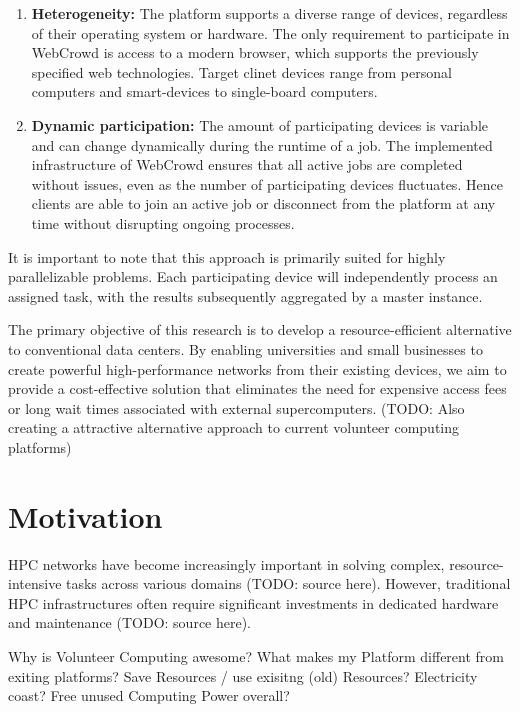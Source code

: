 \begin{enumerate}
    \item \textbf{Heterogeneity:} The platform supports a diverse range of devices, regardless of their operating system or hardware. The only requirement to participate in WebCrowd is access to a modern browser, which supports the previously specified web technologies. Target clinet devices range from personal computers and smart-devices to single-board computers.
    \item \textbf{Dynamic participation:} The amount of participating devices is variable and can change dynamically during the runtime of a job. The implemented infrastructure of WebCrowd ensures that all active jobs are completed without issues, even as the number of participating devices fluctuates. Hence clients are able to join an active job or disconnect from the platform at any time without disrupting ongoing processes.
\end{enumerate}

It is important to note that this approach is primarily suited for highly parallelizable problems. Each participating device will independently process an assigned task, with the results subsequently aggregated by a master instance.

The primary objective of this research is to develop a resource-efficient alternative to conventional data centers. By enabling universities and small businesses to create powerful high-performance networks from their existing devices, we aim to provide a cost-effective solution that eliminates the need for expensive access fees or long wait times associated with external supercomputers. (TODO: Also creating a attractive alternative approach to current volunteer computing platforms)

\section{Motivation}
\label{sec:intro:motivation}
\ac{HPC} networks have become increasingly important in solving complex, resource-intensive tasks across various domains (TODO: source here). However, traditional \ac{HPC} infrastructures often require significant investments in dedicated hardware and maintenance (TODO: source here). 


Why is Volunteer Computing awesome? What makes my Platform different from exiting platforms? Save Resources / use exisitng (old) Resources? Electricity coast? Free unused Computing Power overall?


